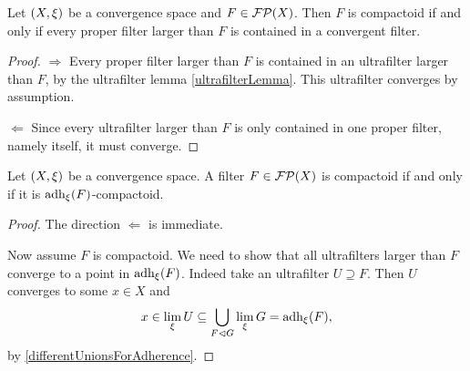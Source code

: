 \begin{lemma}
Let $\sSet{X,\xi}$ be a convergence space and $F\in\operatorname{\mathcal{FP}}(X)$. Then $F$ is compactoid \textup{if and only if} every proper filter larger than $F$ is contained in a convergent filter.
\end{lemma}
\begin{proof}
$\boxed{\Rightarrow}$ Every proper filter larger than $F$ is contained in an ultrafilter larger than $F$, by the ultrafilter lemma \ref{ultrafilterLemma}. This ultrafilter converges by assumption.

$\boxed{\Leftarrow}$ Since every ultrafilter larger than $F$ is only contained in one proper filter, namely itself, it must converge.
\end{proof}

\begin{lemma} \label{allCompactoidLimitsInAdherence}
Let $\sSet{X,\xi}$ be a convergence space. A filter $F\in\operatorname{\mathcal{FP}}(X)$ is compactoid \textup{if and only if} it is $\operatorname{adh}_\xi(F)$-compactoid.
\end{lemma}
\begin{proof}
The direction $\Leftarrow$ is immediate.

Now assume $F$ is compactoid. We need to show that all ultrafilters larger than $F$ converge to a point in $\operatorname{adh}_\xi(F)$. Indeed take an ultrafilter $U\supseteq F$. Then $U$ converges to some $x\in X$ and
\[ x\in \lim_\xi U \subseteq \bigcup_{F\lhd G}\lim_\xi G = \operatorname{adh}_\xi(F), \]
by \ref{differentUnionsForAdherence}.
\end{proof}

